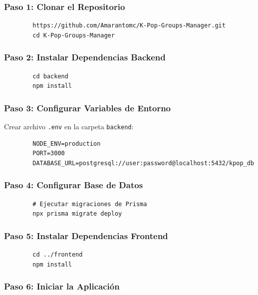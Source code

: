 \documentclass[12pt,a4paper,spanish,oneside]{article}
\begin{document}
	\subsubsection{Paso 1: Clonar el Repositorio}
	
	\begin{verbatim}
		https://github.com/Amarantomc/K-Pop-Groups-Manager.git
		cd K-Pop-Groups-Manager
	\end{verbatim}
	
	\subsubsection{Paso 2: Instalar Dependencias Backend}
	
	\begin{verbatim}
		cd backend
		npm install
	\end{verbatim}
	
	\subsubsection{Paso 3: Configurar Variables de Entorno}
	
	Crear archivo \texttt{.env} en la carpeta \texttt{backend}:
	
	\begin{verbatim}
		NODE_ENV=production
		PORT=3000
		DATABASE_URL=postgresql://user:password@localhost:5432/kpop_db
	\end{verbatim}
	
	\subsubsection{Paso 4: Configurar Base de Datos}
	
	\begin{verbatim}
		# Ejecutar migraciones de Prisma
		npx prisma migrate deploy
	\end{verbatim}
	
	\subsubsection{Paso 5: Instalar Dependencias Frontend}
	
	\begin{verbatim}
		cd ../frontend
		npm install
	\end{verbatim}
	
	\subsubsection{Paso 6: Iniciar la Aplicación}
	
\end{document}

